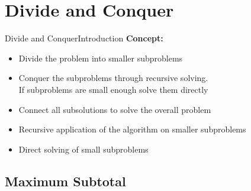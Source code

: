 
\section{Divide and Conquer}


\begin{frame}{Divide and Conquer}{Introduction}
  \textbf{Concept:}
  \begin{itemize}
    \item<2->
      {\color{Mittel-Blau}Divide} the problem into smaller subproblems
    \item<3->
      {\color{Mittel-Blau}Conquer} the subproblems through recursive solving.\\
      If subproblems are small enough solve them directly
    \item<4->
      {\color{Mittel-Blau}Connect} all subsolutions to solve the overall problem
  \end{itemize}
  \vspace{1.0em}
  \begin{itemize}
    \item<5->
      {\color{Mittel-Blau}Recursive} application of the algorithm on smaller
      subproblems
    \item<6->
      {\color{Mittel-Blau}Direct} solving of small subproblems
  \end{itemize}
\end{frame}


\subsection{Maximum Subtotal}

